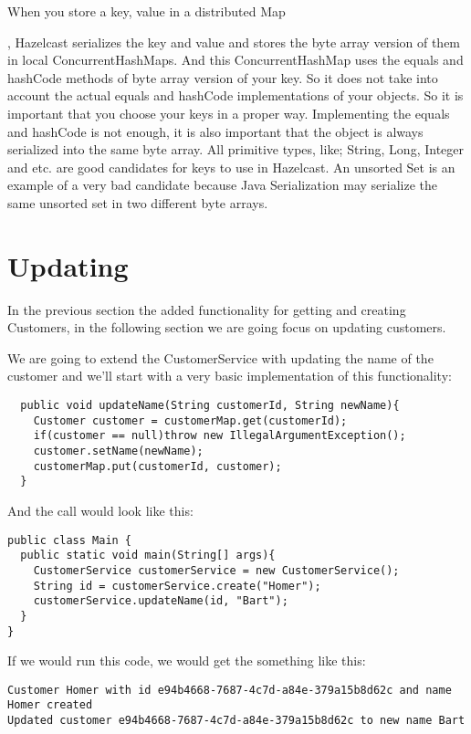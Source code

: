 When you store a key, value in a distributed Map

, Hazelcast serializes the key and value and stores the byte array version of them in local ConcurrentHashMaps. And this ConcurrentHashMap uses the equals and hashCode methods of byte array version of your key. So it does not take into account the actual equals and hashCode implementations of your objects. So it is important that you choose your keys in a proper way. Implementing the equals and hashCode is not enough, it is also important that the object is always serialized into the same byte array. All primitive types, like; String, Long, Integer and etc. are good candidates for keys to use in Hazelcast. An unsorted Set is an example of a very bad candidate because Java Serialization may serialize the same unsorted set in two different byte arrays.

\section{Updating}

In the previous section the added functionality for getting and creating Customers, in the following section we are going focus on updating customers. 

We are going to extend the CustomerService with updating the name of the customer and we'll start with a very basic implementation of this functionality:

\begin{verbatim}
  public void updateName(String customerId, String newName){
    Customer customer = customerMap.get(customerId);
    if(customer == null)throw new IllegalArgumentException();
    customer.setName(newName);
    customerMap.put(customerId, customer);
  }
\end{verbatim}

And the call would look like this:

\begin{verbatim}
public class Main {
  public static void main(String[] args){
    CustomerService customerService = new CustomerService();
    String id = customerService.create("Homer");
    customerService.updateName(id, "Bart");
  }
}
\end{verbatim}

If we would run this code, we would get the something like this:

\begin{verbatim}
Customer Homer with id e94b4668-7687-4c7d-a84e-379a15b8d62c and name Homer created
Updated customer e94b4668-7687-4c7d-a84e-379a15b8d62c to new name Bart
\end{verbatim}

